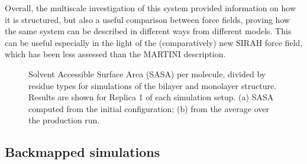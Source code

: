 Overall, the multiscale investigation of this system provided information on how it is structured, but also a useful comparison between force fields, proving how the same system can be described in different ways from different models. This can be useful especially in the light of the (comparatively) new SIRAH force field, which has been less assessed than the MARTINI description.
%
\begin{figure}[t!]
\centering
{} 
\caption[SASA per residue of monolayer and bilater]{Solvent Accessible Surface Area (SASA) per molecule, divided by residue types for simulations of the bilayer and monolayer structure. Results are shown for Replica 1 of each simulation setup. (a) SASA computed from the initial configuration; (b) from the average over the production run.}
\label{fig:mono_bi_sasa}
\end{figure}


\subsection{Backmapped simulations} 

